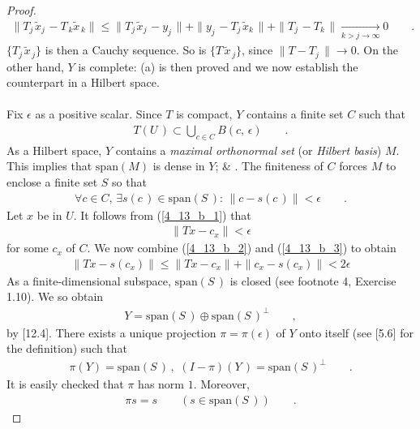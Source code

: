 \begin{proof}
\begin{align}
\| T_{j\,} \tilde{x}_{j\,}  -T_{\, k} \tilde{x}_{\, k}\| \leq
\| T_{j\,} \tilde{x}_{j\,}- y_{j\,}\| +
\| y_{j\,} -T_{j\,} \tilde{x}_{k\,}\| +
\| T_{j\,} - T_{ k\,}\|   \underset{k> j\to \infty}{\longrightarrow}0\qquad .
\end{align}
% 
$\{T_{ j\,} \tilde{x}_{\, j} \}$ is then a Cauchy sequence. So is $\{T \,\tilde{x}_{\, j}\}$, since $\| T-T_{j}\,\| \to 0$. On
the other hand, $Y$ is complete: (a) is then proved and we now establish the counterpart in a Hilbert space.\\
\\
Fix $\epsilon$ as a positive scalar. Since $T$ is compact, $Y$ contains a finite set $C$ such that 
% 
\begin{align}\label{4_13_b_1}
T(U\,)\subset \bigcup_{c\in C} B(c,\, \epsilon)\qquad .
\end{align}
% 
As a Hilbert space, $Y$ contains a \textsl{maximal orthonormal set} (or \textsl{Hilbert basis}) $M$. This implies that
$\text{span}(M)$ is dense in $Y$;  \& . The finiteness of $C$ forces $M$ to enclose a finite
set $S$ so that
% 
\begin{align}\label{4_13_b_2}
\forall c\in C, \, \exists  s(c\,) \in \text{span} (S\,):\, \|c - s(c\,)\| <\epsilon\qquad .
\end{align}
% 
Let $x$ be in $U$. It follows from (\ref{4_13_b_1}) that 
% 
\begin{align}\label{4_13_b_3}
\|Tx - c_x \| < \epsilon
\end{align}
% 
for some $c_x$ of $C$. We now combine (\ref{4_13_b_2}) and (\ref{4_13_b_3}) to obtain
% 
\begin{align}
\|Tx - s(c_x) \| \leq  \| Tx - c_x \| + \| c_x - s(c_x)\| < 2\epsilon
\end{align}
% 
As a finite-dimensional subspace, $\text{span}(S\,)$ is closed (see footnote 4, Exercise 1.10). We so obtain
% 
\begin{align}
Y=\text{span}(S\,)\oplus \text{span}(S\,)^\bot \qquad ,
\end{align}
% 
by [12.4]. There exists a unique projection $\pi=\pi(\epsilon)$ of $Y$ onto itself (see [5.6] for the definition) such that
% 
\begin{align}
\pi (Y) = \text{span}(S\,)\, ,\,  \,  (I-\pi)(Y\,) = \text{span}(S\,)^\bot\qquad .
\end{align}
% 
It is easily checked that $\pi$ has norm $1$. Moreover,
% 
\begin{align}
\pi s = s \qquad (s\in\text{span}(S\,))\qquad .

\end{align}
\end{proof}
